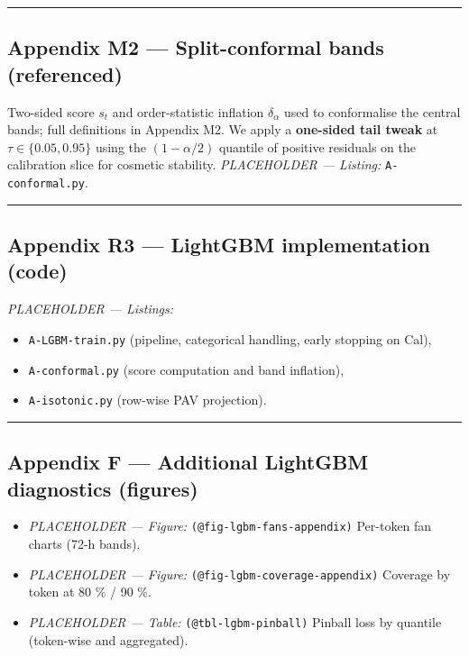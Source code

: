 \documentclass[
  a4paper,
  DIV=11,
  numbers=noendperiod]{scrreprt}
\providecommand{\tightlist}{%
  \setlength{\itemsep}{0pt}\setlength{\parskip}{0pt}}
\begin{document}
\begin{center}\rule{0.5\linewidth}{0.5pt}\end{center}

\subsection{Appendix M2 --- Split-conformal bands
(referenced)}\label{app-m2-conformal}

Two-sided score \(s_t\) and order-statistic inflation \(\delta_\alpha\)
used to conformalise the central bands; full definitions in Appendix M2.
We apply a \textbf{one-sided tail tweak} at \(\tau\in\{0.05,0.95\}\)
using the \((1-\alpha/2)\) quantile of positive residuals on the
calibration slice for cosmetic stability. \emph{PLACEHOLDER ---
Listing:} \texttt{A-conformal.py}.

\begin{center}\rule{0.5\linewidth}{0.5pt}\end{center}

\subsection{Appendix R3 --- LightGBM implementation
(code)}\label{app-r3-lgbm-code}

\emph{PLACEHOLDER --- Listings:}

\begin{itemize}
\tightlist
\item
  \texttt{A-LGBM-train.py} (pipeline, categorical handling, early
  stopping on Cal),
\item
  \texttt{A-conformal.py} (score computation and band inflation),
\item
  \texttt{A-isotonic.py} (row-wise PAV projection).
\end{itemize}

\begin{center}\rule{0.5\linewidth}{0.5pt}\end{center}

\subsection{Appendix F --- Additional LightGBM diagnostics
(figures)}\label{appendix-f-additional-lightgbm-diagnostics-figures}

\begin{itemize}
\tightlist
\item
  \emph{PLACEHOLDER --- Figure:} \texttt{(@fig-lgbm-fans-appendix)}
  Per-token fan charts (72-h bands).
\item
  \emph{PLACEHOLDER --- Figure:} \texttt{(@fig-lgbm-coverage-appendix)}
  Coverage by token at 80 \% / 90 \%.
\item
  \emph{PLACEHOLDER --- Table:} \texttt{(@tbl-lgbm-pinball)} Pinball
  loss by quantile (token-wise and aggregated).
\end{itemize}
\end{document}
